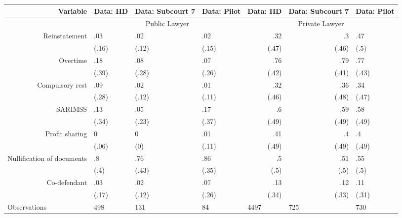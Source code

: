 \begin{tabular}{rrrrrrr}
\toprule
Variable & Data: HD & Data: Subcourt 7 & Data: Pilot & Data: HD & Data: Subcourt 7 & Data: Pilot \\
\toprule
      & \multicolumn{3}{c}{Public Lawyer} & \multicolumn{3}{c}{Private Lawyer} \\
      \midrule
      \midrule
Reinstatement & \multicolumn{1}{l}{.03} & \multicolumn{1}{l}{.02} & \multicolumn{1}{l}{.02} & .32   & .3    & \multicolumn{1}{l}{.47} \\
      & \multicolumn{1}{l}{(.16)} & \multicolumn{1}{l}{(.12)} & \multicolumn{1}{l}{(.15)} & (.47) & (.46) & \multicolumn{1}{l}{(.5)} \\
Overtime & \multicolumn{1}{l}{.18} & \multicolumn{1}{l}{.08} & \multicolumn{1}{l}{.07} & .76   & .79   & \multicolumn{1}{l}{.77} \\
      & \multicolumn{1}{l}{(.39)} & \multicolumn{1}{l}{(.28)} & \multicolumn{1}{l}{(.26)} & (.42) & (.41) & \multicolumn{1}{l}{(.43)} \\
Compulsory rest & \multicolumn{1}{l}{.09} & \multicolumn{1}{l}{.02} & \multicolumn{1}{l}{.01} & .32   & .36   & \multicolumn{1}{l}{.34} \\
      & \multicolumn{1}{l}{(.28)} & \multicolumn{1}{l}{(.12)} & \multicolumn{1}{l}{(.11)} & (.46) & (.48) & \multicolumn{1}{l}{(.47)} \\
SARIMSS & \multicolumn{1}{l}{.13} & \multicolumn{1}{l}{.05} & \multicolumn{1}{l}{.17} & .6    & .59   & \multicolumn{1}{l}{.58} \\
      & \multicolumn{1}{l}{(.34)} & \multicolumn{1}{l}{(.23)} & \multicolumn{1}{l}{(.37)} & (.49) & (.49) & \multicolumn{1}{l}{(.49)} \\
Profit sharing & \multicolumn{1}{l}{0} & \multicolumn{1}{l}{0} & \multicolumn{1}{l}{.01} & .41   & .4    & \multicolumn{1}{l}{.4} \\
      & \multicolumn{1}{l}{(.06)} & \multicolumn{1}{l}{(0)} & \multicolumn{1}{l}{(.11)} & (.49) & (.49) & \multicolumn{1}{l}{(.49)} \\
Nullification of documents & \multicolumn{1}{l}{.8} & \multicolumn{1}{l}{.76} & \multicolumn{1}{l}{.86} & .5    & .51   & \multicolumn{1}{l}{.55} \\
      & \multicolumn{1}{l}{(.4)} & \multicolumn{1}{l}{(.43)} & \multicolumn{1}{l}{(.35)} & (.5)  & (.5)  & \multicolumn{1}{l}{(.5)} \\
Co-defendant & \multicolumn{1}{l}{.03} & \multicolumn{1}{l}{.02} & \multicolumn{1}{l}{.07} & .13   & .12   & \multicolumn{1}{l}{.11} \\
      & \multicolumn{1}{l}{(.17)} & \multicolumn{1}{l}{(.12)} & \multicolumn{1}{l}{(.26)} & (.34) & (.33) & \multicolumn{1}{l}{(.31)} \\
      \bottomrule
\multicolumn{1}{l}{Observations} & \multicolumn{1}{l}{498} & \multicolumn{1}{l}{131} & \multicolumn{1}{l}{84} & \multicolumn{1}{l}{4497} & \multicolumn{1}{l}{725} & \multicolumn{1}{l}{730} \\
\bottomrule
\bottomrule
\end{tabular}%
